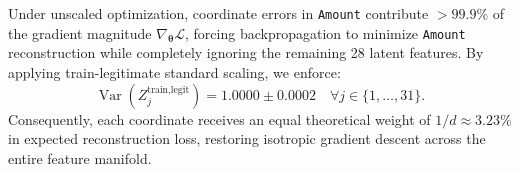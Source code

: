 Under unscaled optimization, coordinate errors in \texttt{Amount} contribute $>99.9\%$ of the gradient magnitude $\nabla_{\boldsymbol{\theta}} \mathcal{L}$, forcing backpropagation to minimize \texttt{Amount} reconstruction while completely ignoring the remaining 28 latent features. By applying train-legitimate standard scaling, we enforce:
\begin{equation}
    \operatorname{Var}(Z_j^{\text{train,legit}}) = 1.0000 \pm 0.0002 \quad \forall j \in \{1, \dots, 31\}.
\end{equation}
Consequently, each coordinate receives an equal theoretical weight of $1/d \approx 3.23\%$ in expected reconstruction loss, restoring isotropic gradient descent across the entire feature manifold.
